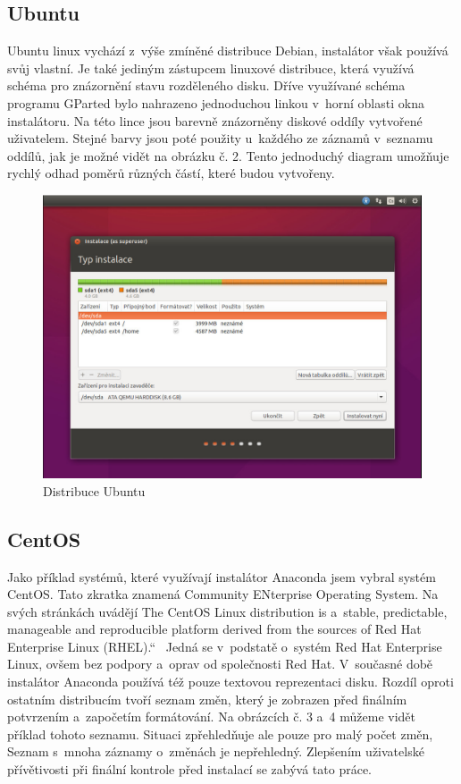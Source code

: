 \documentclass[a4paper,twosided]{article}
\newcommand{\uv}[1]{\quotedblbase #1\textquotedblleft}
\begin{document}
\subsection{Ubuntu}

Ubuntu linux vychází z~výše zmíněné distribuce Debian, instalátor však používá svůj vlastní. Je také jediným zástupcem linuxové distribuce, která využívá  schéma 
pro znázornění stavu rozděleného disku. Dříve využívané schéma programu GParted bylo nahrazeno jednoduchou linkou v~horní oblasti okna instalátoru. Na této lince jsou barevně znázorněny diskové 
oddíly vytvořené uživatelem. Stejné barvy jsou poté použity u~každého ze záznamů v~seznamu oddílů, jak je možné vidět na obrázku č. 2. Tento jednoduchý diagram umožňuje rychlý odhad poměrů různých 
částí, které budou vytvořeny.

\begin{figure}[b]
\label{fig:ubuntu}
\caption{Distribuce Ubuntu}
\centering
\includegraphics[width=.8\columnwidth]{pics/ubuntu1.jpg}
\end{figure}

\subsection{CentOS}

Jako příklad systémů, které využívají instalátor Anaconda jsem vybral systém CentOS. Tato zkratka znamená Community ENterprise Operating System. Na svých stránkách uvádějí \uv{The CentOS Linux
distribution is a~stable, predictable, manageable and reproducible platform derived from the sources of Red Hat Enterprise Linux (RHEL).}~\cite{CentOS} Jedná se v~podstatě o~systém Red Hat Enterprise 
Linux, ovšem bez podpory a~oprav od společnosti Red Hat. V~současné době instalátor Anaconda používá též pouze textovou reprezentaci disku. Rozdíl oproti ostatním distribucím tvoří 
seznam změn, který je zobrazen před finálním potvrzením a~započetím formátování. Na obrázcích č. 3 a~4 můžeme vidět příklad tohoto seznamu. Situaci zpřehledňuje ale pouze pro malý počet změn, Seznam s~mnoha 
záznamy o~změnách je nepřehledný. Zlepšením uživatelské přívětivosti při finální kontrole před instalací se zabývá tato práce.
\end{document}
